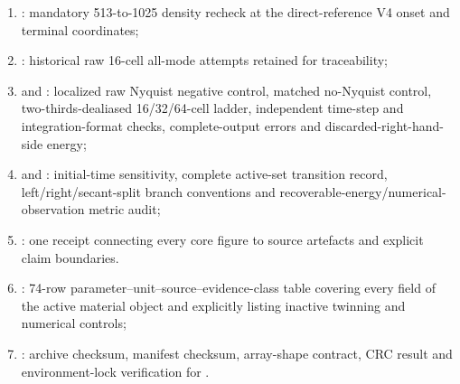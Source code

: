 \begin{enumerate}
\item {}: mandatory 513-to-1025 density recheck at the direct-reference V4 onset and terminal coordinates;
\item {}: historical raw 16-cell all-mode attempts retained for traceability;
\item {} and : localized raw Nyquist negative control, matched no-Nyquist control, two-thirds-dealiased 16/32/64-cell ladder, independent time-step and integration-format checks, complete-output errors and discarded-right-hand-side energy;
\item {} and : initial-time sensitivity, complete active-set transition record, left/right/secant-split branch conventions and recoverable-energy/numerical-observation metric audit;
\item {}: one receipt connecting every core figure to source artefacts and explicit claim boundaries.
\item {}: 74-row parameter--unit--source--evidence-class table covering every field of the active material object and explicitly listing inactive twinning and numerical controls;
\item {}: archive checksum, manifest checksum, array-shape contract, CRC result and environment-lock verification for .
\end{enumerate}

